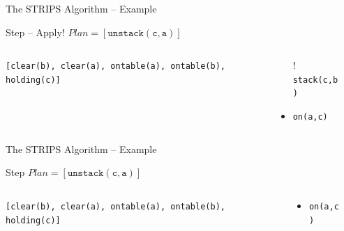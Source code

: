 \documentclass[presentation]{beamer}\mode<presentation>{\usetheme{AMSBolognaFC}}
\begin{document}
\begin{frame}[c]{The STRIPS Algorithm -- Example}
\small

\begin{exampleblock}{Step \nextStripsExampleStep{} -- Apply! \hfill $Plan = [\mathtt{unstack(c,a)}]$}
    \begin{columns}[t]
        \begin{column}{.30\linewidth}\centering
            \texttt{[clear(b), clear(a), ontable(a), ontable(b), holding(c)]}
        \end{column}
        \begin{column}{.50\linewidth}\centering
            \begin{itemize}
                \item[!] \texttt{stack(c,b)}
                \item \texttt{on(a,c)}
            \end{itemize}
        \end{column}
        \begin{column}{.10\linewidth}\centering
            
        \end{column}
    \end{columns}
\end{exampleblock}

\end{frame}


\begin{frame}[c]{The STRIPS Algorithm -- Example}
\small

\begin{exampleblock}{Step \nextStripsExampleStep{} \hfill $Plan = [\mathtt{unstack(c,a)}]$}
    \begin{columns}[t]
        \begin{column}{.30\linewidth}\centering
            \alert{\texttt{[clear(b), clear(a), ontable(a), ontable(b), holding(c)]}}
        \end{column}
        \begin{column}{.50\linewidth}\centering
            \begin{itemize}
                \item \texttt{on(a,c)}
            \end{itemize}
        \end{column}
        \begin{column}{.10\linewidth}\centering
            
        \end{column}
    \end{columns}
\end{exampleblock}

\end{frame}
\end{document}
